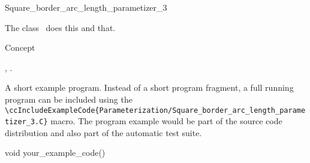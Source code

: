 

\begin{ccRefClass}{Square_border_arc_length_parametizer_3}  %


\ccDefinition
  
The class \ccRefName\ does this and that.


\ccIsModel

Concept

\ccTypes


\ccCreation
{}  %


\ccOperations


\ccSeeAlso

,
.

\ccExample

A short example program.
Instead of a short program fragment, a full running program can be
included using the 
\verb|\ccIncludeExampleCode{Parameterization/Square_border_arc_length_parametizer_3.C}| 
macro. The program example would be part of the source code distribution and
also part of the automatic test suite.

\begin{ccExampleCode}
void your_example_code() {
}
\end{ccExampleCode}


\end{ccRefClass}


